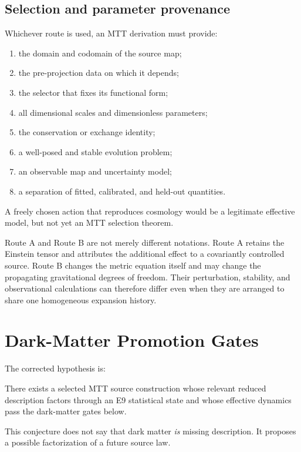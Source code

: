 \documentclass[11pt]{article}
\begin{document}
\subsection{Selection and parameter provenance}

Whichever route is used, an MTT derivation must provide:
\begin{enumerate}[label=\arabic*.]
\item the domain and codomain of the source map;
\item the pre-projection data on which it depends;
\item the selector that fixes its functional form;
\item all dimensional scales and dimensionless parameters;
\item the conservation or exchange identity;
\item a well-posed and stable evolution problem;
\item an observable map and uncertainty model;
\item a separation of fitted, calibrated, and held-out quantities.
\end{enumerate}

A freely chosen action that reproduces cosmology would be a legitimate
effective model, but not yet an MTT selection theorem.

Route A and Route B are not merely different notations.  Route A retains the
Einstein tensor and attributes the additional effect to a covariantly
controlled source.  Route B changes the metric equation itself and may change
the propagating gravitational degrees of freedom.  Their perturbation,
stability, and observational calculations can therefore differ even when they
are arranged to share one homogeneous expansion history.

\section{Dark-Matter Promotion Gates}

The corrected hypothesis is:

\begin{conjecture}
\label{conj:dm}
There exists a selected MTT source construction whose relevant reduced
description factors through an E9 statistical state and whose effective
dynamics pass the dark-matter gates below.
\end{conjecture}

This conjecture does not say that dark matter \emph{is} missing description.
It proposes a possible factorization of a future source law.
\end{document}
